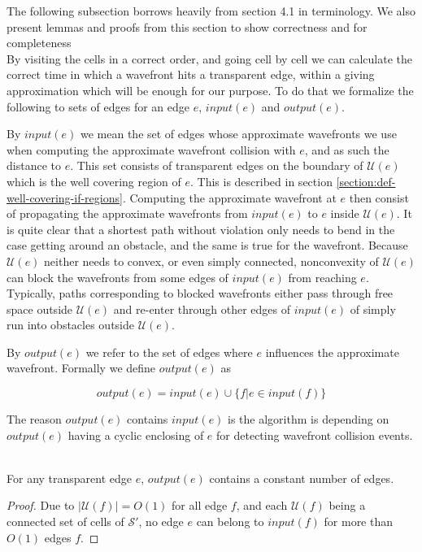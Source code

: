 The following subsection borrows heavily from \cite{HershbergerS99} section 4.1 in 
terminology. We also present lemmas and proofs from this section to show correctness 
and for completeness \\

By visiting the cells in a correct order, and going cell by cell we can calculate the 
correct time in which a wavefront hits a transparent edge, within a giving 
approximation which will be enough for our purpose. To do that we formalize the 
following to sets of edges for an edge $e$, $input(e)$ and $output(e)$.

By $input(e)$ we mean the set of edges whose approximate wavefronts we use when computing 
the approximate wavefront collision with $e$, and as such the distance to $e$. This set 
consists of transparent edges on the boundary of $\mathcal{U}(e)$ which is the well covering 
region of $e$. This is described in section \ref{section:def-well-covering-if-regions}.
Computing the approximate wavefront at $e$ then consist of propagating the approximate 
wavefronts from $input(e)$ to $e$ inside $\mathcal{U}(e)$. It is quite clear that a shortest 
path without violation only needs to bend in the case getting around an obstacle, and the 
same is true for the wavefront. Because $\mathcal{U}(e)$ neither needs to convex, or even 
simply connected, nonconvexity of $\mathcal{U}(e)$ can block the wavefronts from some edges 
of $input(e)$ from reaching $e$. Typically, paths corresponding to blocked wavefronts either 
pass through free space outside $\mathcal{U}(e)$ and re-enter through other edges of 
$input(e)$ of simply run into obstacles outside $\mathcal{U}(e)$. 

By $output(e)$ we refer to the set of edges where $e$ influences the approximate wavefront. 
Formally we define $output(e)$ as 

$$output(e) = input(e) \cup \{ f | e \in input(f) \}$$

The reason $output(e)$ contains $input(e)$ is the algorithm is depending on $output(e)$ 
having a cyclic enclosing of $e$ for detecting wavefront collision events.

\begin{Lemma} \label{lemma:4.1} \hspace{1cm} \\
For any transparent edge $e$, $output(e)$ contains a constant number of edges.
\end{Lemma}
\begin{proof}
	Due to $|\mathcal{U}(f)| = O(1)$ for all edge $f$, and each $\mathcal{U}(f)$ being a 
    connected set of cells of $\mathcal{S}'$, no edge $e$ can belong to $input(f)$ for more 
    than $O(1)$ edges $f$.
\end{proof}

